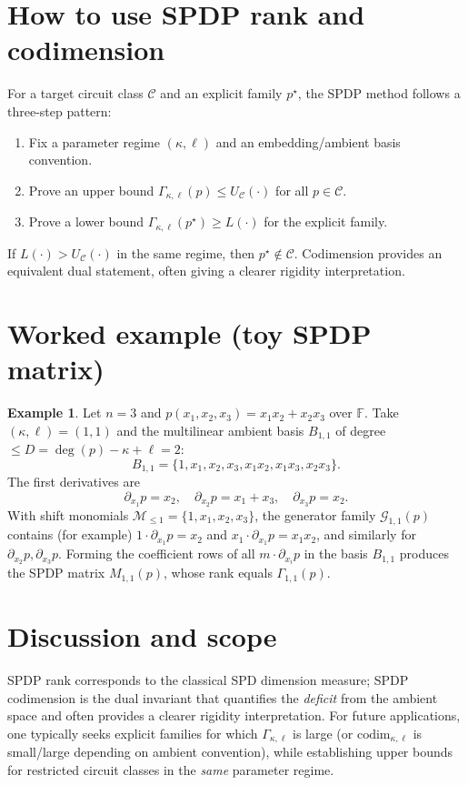 \documentclass[12pt]{article}
\theoremstyle{definition}
\newtheorem{example}[theorem]{Example}
\theoremstyle{remark}
\newcommand{\F}{\mathbb{F}}
\newcommand{\rankSPDP}{\Gamma}
\newcommand{\codimSPDP}{\mathrm{codim}}
\begin{document}
\section{How to use SPDP rank and codimension}
\label{sec:how-to-use}

For a target circuit class $\mathcal{C}$ and an explicit family $p^\star$, the SPDP method
follows a three-step pattern:
\begin{enumerate}[label=(\roman*),leftmargin=2.4em]
\item Fix a parameter regime $(\kappa,\ell)$ and an embedding/ambient basis convention.
\item Prove an upper bound $\Gamma_{\kappa,\ell}(p)\le U_{\mathcal{C}}(\cdot)$ for all $p\in\mathcal{C}$.
\item Prove a lower bound $\Gamma_{\kappa,\ell}(p^\star)\ge L(\cdot)$ for the explicit family.
\end{enumerate}
If $L(\cdot) > U_{\mathcal{C}}(\cdot)$ in the same regime, then $p^\star \not\in \mathcal{C}$.
Codimension provides an equivalent dual statement, often giving a clearer rigidity
interpretation.

\section{Worked example (toy SPDP matrix)}
\label{sec:toy-example}

\begin{example}
Let $n=3$ and $p(x_1,x_2,x_3)=x_1x_2+x_2x_3$ over $\F$. Take $(\kappa,\ell)=(1,1)$ and the
multilinear ambient basis $B_{1,1}$ of degree $\le D=\deg(p)-\kappa+\ell=2$:
\[
  B_{1,1}=\{1,x_1,x_2,x_3,x_1x_2,x_1x_3,x_2x_3\}.
\]
The first derivatives are
\[
  \partial_{x_1}p=x_2,\quad \partial_{x_2}p=x_1+x_3,\quad \partial_{x_3}p=x_2.
\]
With shift monomials $\mathcal{M}_{\le 1}=\{1,x_1,x_2,x_3\}$, the generator family
$\mathcal{G}_{1,1}(p)$ contains (for example) $1\cdot \partial_{x_1}p=x_2$ and
$x_1\cdot \partial_{x_1}p=x_1x_2$, and similarly for $\partial_{x_2}p,\partial_{x_3}p$.
Forming the coefficient rows of all $m\cdot \partial_{x_i}p$ in the basis $B_{1,1}$
produces the SPDP matrix $M_{1,1}(p)$, whose rank equals $\Gamma_{1,1}(p)$.
\end{example}

\section{Discussion and scope}
\label{sec:discussion}
SPDP rank corresponds to the classical SPD dimension measure; SPDP codimension is
the dual invariant that quantifies the \emph{deficit} from the ambient space and
often provides a clearer rigidity interpretation. For future applications, one
typically seeks explicit families for which $\rankSPDP_{\kappa,\ell}$ is large (or
$\codimSPDP_{\kappa,\ell}$ is small/large depending on ambient convention), while
establishing upper bounds for restricted circuit classes in the \emph{same}
parameter regime.
\end{document}
